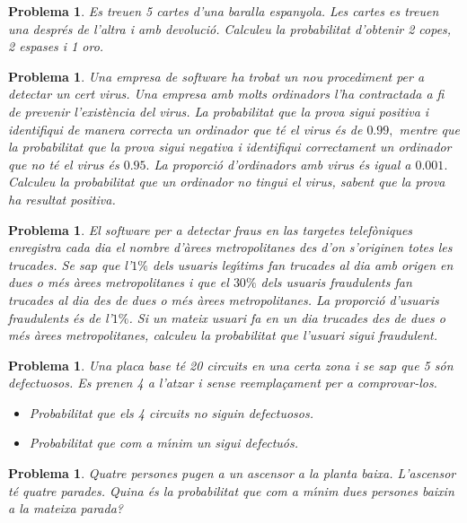 \documentclass[11pt]{article}
\newcounter{prbcont}
\newtheorem{problema}[prbcont]{Problema}
\begin{document}
\begin{problema}
Es treuen 5 cartes d'una baralla espanyola. Les cartes es treuen una despr\'es de l'altra i amb devoluci\'o. Calculeu la probabilitat d'obtenir 2 copes, 2 espases i 1 oro. %
\end{problema}

\begin{problema}
Una empresa de software ha trobat un nou procediment per a detectar un cert virus. Una empresa amb molts ordinadors l'ha contractada a fi de prevenir l'exist\`encia del virus. La probabilitat que la prova sigui positiva i identifiqui de manera correcta un ordinador que t\'e el virus \'es de $0.99,$ mentre que la probabilitat que la prova sigui negativa i identifiqui correctament un ordinador que no t\'e el virus \'es $0.95.$ La proporci\'o d'ordinadors amb virus \'es igual a $0.001.$ Calculeu la probabilitat que un ordinador no tingui el virus, sabent que la prova ha resultat positiva.
\end{problema}

\begin{problema}
El software per a detectar fraus en las targetes telef\`oniques enregistra cada dia el nombre d'\`arees metropolitanes des d'on s'originen totes les trucades. Se sap que l'$1\% $ dels usuaris leg\'{\i}tims fan trucades al dia amb origen en dues o m\'es \`arees metropolitanes i que el $30\%$ dels usuaris fraudulents fan trucades al dia des de dues o m\'es \`arees metropolitanes. La proporci\'o d'usuaris fraudulents \'es de l'$1\%$. Si un mateix usuari fa en un dia trucades des de dues o m\'es \`arees metropolitanes, calculeu la probabilitat que l'usuari sigui fraudulent.
\end{problema}

\begin{problema} 
Una placa base t\'e 20 circuits en una certa zona i se sap que 5 s\'on defectuosos. Es prenen 4 a l'atzar i sense reempla\c{c}ament per a comprovar-los. 
\begin{itemize}
\item [(a)] Probabilitat que els 4 circuits no siguin defectuosos.
\item [(b)] Probabilitat que com a m\'{\i}nim un sigui defectu\'os.
\end{itemize}
\end{problema}

\begin{problema}
Quatre persones pugen a un ascensor a la planta baixa. L'ascensor t\'e quatre parades. Quina \'es la probabilitat que com a m\'{\i}nim dues persones baixin a la mateixa parada?
\end{problema}
\end{document}
